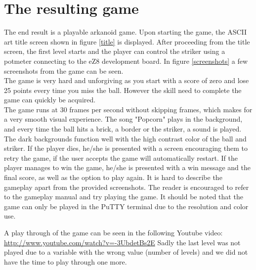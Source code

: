 
\section{The resulting game}
The end result is a playable arkanoid game. Upon starting the game, the ASCII art title screen
shown in figure \ref{title} is displayed. After proceeding from the title screen, the first
level starts and the player can control the striker using a potmeter connecting to the eZ8
development board. In figure \ref{screenshots} a few screenshots from the game can be seen. \\

The game is very hard and unforgiving as you start with a score of zero and lose 25 points every
time you miss the ball. However the skill need to complete the game can quickly be
acquired. \\

The game runs at 30 frames per second without skipping frames, which makes for a very
smooth visual experience. The song "Popcorn" plays in the background, and every time
the ball hits a brick, a border or the striker, a sound is played.
 The dark backgrounds function well with the high contrast
color of the ball and striker. If the player dies, he/she is presented with a screen
encouraging them to retry the game, if the user accepts the game will automatically restart.
If the player manages to win the game, he/she is presented with a win message and the final
score, as well as the option to play again.  It is hard to describe the gameplay apart from the
provided screenshots. The reader is encouraged to refer to the gameplay manual and
try playing the game. It should be noted that the game can only be played in the PuTTY terminal
due to the resolution and color use.

A play through of the game can be seen in the following Youtube video:
\url{http://www.youtube.com/watch?v=-3UbdetBs2E}
Sadly the last level was not played due to a variable with the wrong value
(number of levels) and we did not have the time to play through one more. 

